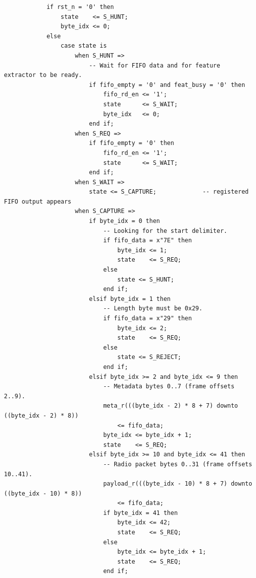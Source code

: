 \documentclass[11pt,letterpaper]{article}
\begin{document}
\begin{lstlisting}
            if rst_n = '0' then
                state    <= S_HUNT;
                byte_idx <= 0;
            else
                case state is
                    when S_HUNT =>
                        -- Wait for FIFO data and for feature extractor to be ready.
                        if fifo_empty = '0' and feat_busy = '0' then
                            fifo_rd_en <= '1';
                            state      <= S_WAIT;
                            byte_idx   <= 0;
                        end if;
                    when S_REQ =>
                        if fifo_empty = '0' then
                            fifo_rd_en <= '1';
                            state      <= S_WAIT;
                        end if;
                    when S_WAIT =>
                        state <= S_CAPTURE;             -- registered FIFO output appears
                    when S_CAPTURE =>
                        if byte_idx = 0 then
                            -- Looking for the start delimiter.
                            if fifo_data = x"7E" then
                                byte_idx <= 1;
                                state    <= S_REQ;
                            else
                                state <= S_HUNT;
                            end if;
                        elsif byte_idx = 1 then
                            -- Length byte must be 0x29.
                            if fifo_data = x"29" then
                                byte_idx <= 2;
                                state    <= S_REQ;
                            else
                                state <= S_REJECT;
                            end if;
                        elsif byte_idx >= 2 and byte_idx <= 9 then
                            -- Metadata bytes 0..7 (frame offsets 2..9).
                            meta_r(((byte_idx - 2) * 8 + 7) downto ((byte_idx - 2) * 8))
                                <= fifo_data;
                            byte_idx <= byte_idx + 1;
                            state    <= S_REQ;
                        elsif byte_idx >= 10 and byte_idx <= 41 then
                            -- Radio packet bytes 0..31 (frame offsets 10..41).
                            payload_r(((byte_idx - 10) * 8 + 7) downto ((byte_idx - 10) * 8))
                                <= fifo_data;
                            if byte_idx = 41 then
                                byte_idx <= 42;
                                state    <= S_REQ;
                            else
                                byte_idx <= byte_idx + 1;
                                state    <= S_REQ;
                            end if;

\end{lstlisting}
\end{document}

